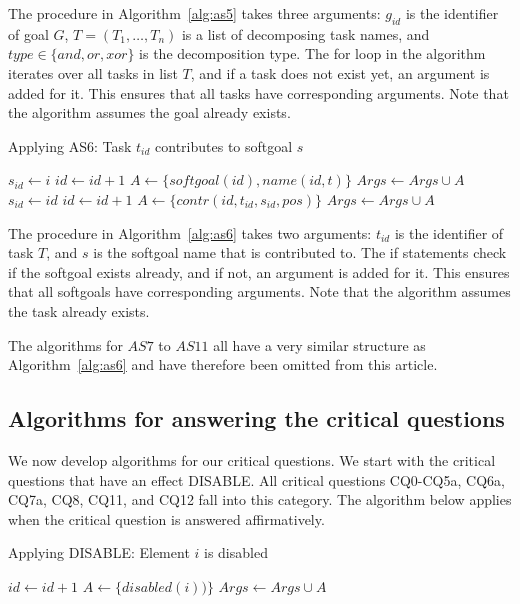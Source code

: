 \rationale{} The procedure in Algorithm~\ref{alg:as5} takes three arguments: $g_{id}$ is the identifier of goal $G$, $T=(T_1,\ldots,T_n)$ is a list of decomposing task names, and $type\in\{and,or,xor\}$ is the decomposition type. The for loop in the algorithm iterates over all tasks in list $T$, and if a task does not exist yet, an argument is added for it. This ensures that all tasks have corresponding arguments. Note that the algorithm assumes the goal already exists.

\begin{algorithm}[h]
  \caption{Applying AS6: Task $t_{id}$ contributes to softgoal $s$}\label{alg:as6}
  \begin{algorithmic}[1]
        \State $s_{id} \gets i$
    \Else
      \State $id\gets id+1$
      \State $A \gets \{softgoal(id),name(id,t)\}$
      \State $Args \gets Args\cup A$
      \State $s_{id} \gets id$
    \EndIf
    \State $id\gets id+1$
    \State $A\gets \{contr(id, t_{id}, s_{id}, pos)\}$
    \State $Args \gets Args\cup A$
    \EndProcedure
  \end{algorithmic}
\end{algorithm}

\rationale{} The procedure in Algorithm~\ref{alg:as6} takes two arguments: $t_{id}$ is the identifier of task $T$, and $s$ is the softgoal name that is contributed to. The if statements check if the softgoal exists already, and if not, an argument is added for it. This ensures that all softgoals have corresponding arguments. Note that the algorithm assumes the task already exists.

The algorithms for $AS7$ to $AS11$ all have a very similar structure as Algorithm~\ref{alg:as6} and have therefore been omitted from this article.

\subsection{Algorithms for answering the critical questions}

We now develop algorithms for our critical questions. We start with the critical questions that have an effect DISABLE. All critical questions CQ0-CQ5a, CQ6a, CQ7a, CQ8, CQ11, and CQ12 fall into this category. The algorithm below applies when the critical question is answered affirmatively.

\begin{algorithm}[h]
  \caption{Applying DISABLE: Element $i$ is disabled}\label{alg:disable}
  \begin{algorithmic}[1]
    \State $id\gets id+1$
    \State $A\gets \{disabled(i))\}$
    \State $Args \gets Args\cup A$
    \EndProcedure
  \end{algorithmic}
\end{algorithm}


